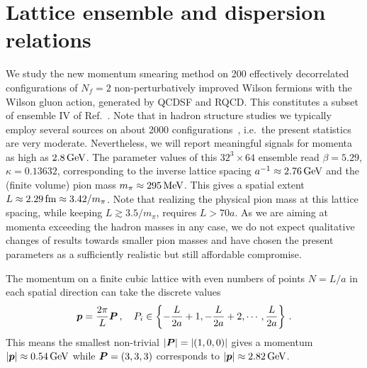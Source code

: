 \section{Lattice ensemble and dispersion relations}
\label{sec:simulate}
We study the new momentum smearing method on 200 effectively decorrelated
configurations of $N_f=2$ non-perturbatively improved
Wilson fermions with the Wilson gluon action, generated by QCDSF
and RQCD. This constitutes a subset of
ensemble IV of Ref.~\cite{Bali:2014gha}.  Note that in
hadron structure studies we typically employ several sources
on about 2000 configurations~\cite{Bali:2014gha}, i.e.\
the present statistics are very moderate. Nevertheless, we
will report meaningful signals for momenta as high as
$2.8\,\textmd{GeV}$. The parameter values
of this $32^3\times 64$ ensemble read
$\beta=5.29$, $\kappa=0.13632$, corresponding to the inverse
lattice spacing  $a^{-1}\approx 2.76\,\textmd{GeV}$ and the (finite volume)
pion mass $m_{\pi}\approx 295\,\textmd{MeV}$. This gives a spatial
extent $L\approx 2.29\,\textmd{fm}\approx 3.42/m_{\pi}$.
Note that realizing the physical pion mass at this lattice spacing,
while keeping $L\gtrsim 3.5/m_{\pi}$, requires $L>70a$. As we are aiming
at momenta exceeding the hadron masses in any case, we do not
expect qualitative changes of results towards smaller pion masses
and have chosen the present parameters as a sufficiently
realistic but still affordable compromise. 

The momentum on a finite cubic lattice with even numbers of
points $N=L/a$ in each spatial direction
can take the discrete values
\begin{equation}
\label{quantize}
\boldsymbol{p}=\frac{2\pi}{L}\boldsymbol{P}\,,\quad
P_i\in\left\{-\frac{L}{2a}+1,-\frac{L}{2a}+2,\cdots, \frac{L}{2a}\right\}\,.
\end{equation}
This means the smallest non-trivial $|\boldsymbol{P}|=|(1,0,0)|$ gives
a momentum $|\boldsymbol{p}|\approx 0.54\,\textmd{GeV}$ while
$\boldsymbol{P}=(3,3,3)$ corresponds to $|\boldsymbol{p}|\approx 2.82\,\textmd{GeV}$.

